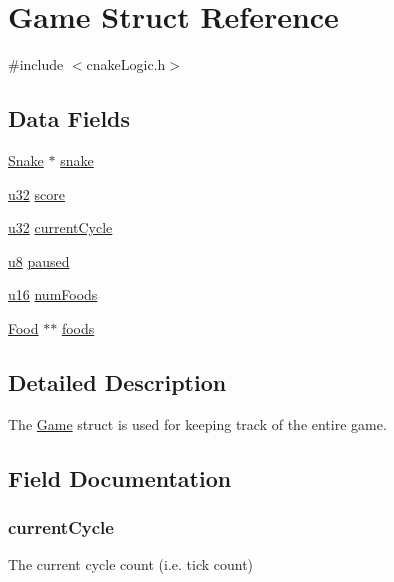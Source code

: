 \hypertarget{struct_game}{}\section{Game Struct Reference}
\label{struct_game}


{\ttfamily \#include $<$cnake\+Logic.\+h$>$}

\subsection*{Data Fields}
\begin{DoxyCompactItemize}
\item 
\hyperlink{struct_snake}{Snake} $\ast$ \hyperlink{struct_game_a408cd599ea288e5b692809edb69e65c2}{snake}
\item 
\hyperlink{my_lib_8h_a10e94b422ef0c20dcdec20d31a1f5049}{u32} \hyperlink{struct_game_aa164f9e96d69917e222030f95185f844}{score}
\item 
\hyperlink{my_lib_8h_a10e94b422ef0c20dcdec20d31a1f5049}{u32} \hyperlink{struct_game_a514de0cd72def19660b79631e4c1bdd4}{current\+Cycle}
\item 
\hyperlink{my_lib_8h_aed742c436da53c1080638ce6ef7d13de}{u8} \hyperlink{struct_game_a3ade7f893f61c2117f2ed3b49842cd64}{paused}
\item 
\hyperlink{my_lib_8h_a9e6c91d77e24643b888dbd1a1a590054}{u16} \hyperlink{struct_game_a6eb06bc26a099c346c277fcaa4a1f30e}{num\+Foods}
\item 
\hyperlink{struct_food}{Food} $\ast$$\ast$ \hyperlink{struct_game_aab913a1e81d59801882afbd45fa496d1}{foods}
\end{DoxyCompactItemize}


\subsection{Detailed Description}
The \hyperlink{struct_game}{Game} struct is used for keeping track of the entire game. 

\subsection{Field Documentation}
\subsubsection[{\texorpdfstring{current\+Cycle}{currentCycle}}]{ current\+Cycle}\hypertarget{struct_game_a514de0cd72def19660b79631e4c1bdd4}{}\label{struct_game_a514de0cd72def19660b79631e4c1bdd4}
The current cycle count (i.\+e. tick count) 
